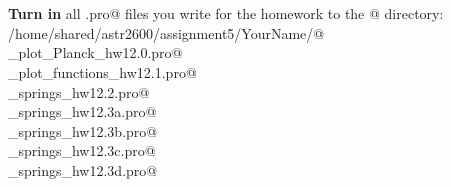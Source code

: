 \documentclass{article}
\begin{document}
\begin{spacing}{1.0}
 ~\\
~\\ 
 \textbf{Turn in} all \verb@.pro@ files you write for the homework to the @ directory: \\
 \verb@/home/shared/astr2600/assignment5/YourName/@ \\
 \verb@YourName_plot_Planck_hw12.0.pro@ \\
 \verb@YourName_plot_functions_hw12.1.pro@ \\
 \verb@YourName_springs_hw12.2.pro@ \\
 \verb@YourName_springs_hw12.3a.pro@ \\
 \verb@YourName_springs_hw12.3b.pro@ \\
 \verb@YourName_springs_hw12.3c.pro@ \\
 \verb@YourName_springs_hw12.3d.pro@  \\
 ~\\
~\\ 
 ~\\
~\\ 
 ~\\
~\\ 
 ~\\
~\\ 
 ~\\
~\\ 
 ~\\
~\\ 
 ~\\
~\\ 
 ~\\
~\\ 
 ~\\
~\\ 
 ~\\
~\\ 
 
 
 \end{spacing}
 
\end{document}
